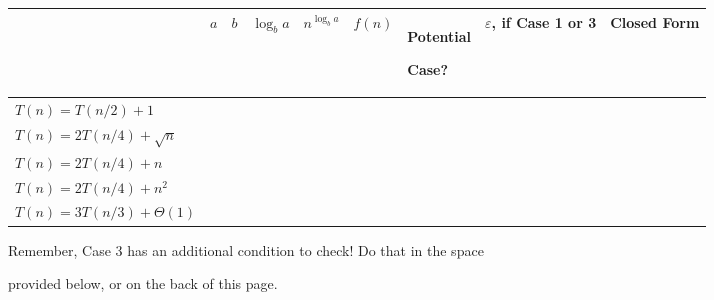 \documentclass{article}
\begin{document}
\begin{table}[h!]

    \centering

    \begin{tabular}{|l|l|l|l|l|l|l|l|l|}

        \hline

        &  $a$ & $b$  & $\log_b a$  & $n^{\log_b a}$  & $f(n)$  & Potential

        Case? & $\varepsilon$, if Case 1 or 3  & Closed Form \\ \hline

        \hline

        $T(n) = T(n/2)+1$             & &  &  &  &  & & & \\[5ex] \hline

        $T(n) = 2 T(n/4) + \sqrt{n}$  & &  &  &  & &  & & \\[5ex] \hline

        $T(n) = 2 T(n/4) + n$         & &  &  &  &  & & &  \\[5ex] \hline

        $T(n) = 2 T(n/4) + n^2$       & &  &  &  &  & & & \\[5ex] \hline

        $T(n) = 3 T(n/3) + \Theta(1)$ & &  &  &  & & & & \\[5ex] \hline

    \end{tabular}

\end{table}

Remember, Case 3 has an additional condition to check! Do that in the space

provided below, or on the back of this page.\\

\fbox{\begin{minipage}{6.5in}\hfill\vspace{1in}\end{minipage}}
\end{document}
